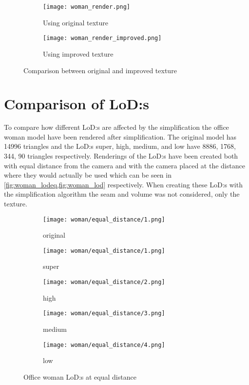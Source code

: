 \begin{figure}[ht]
  \centering
  \begin{subfigure}[b]{.15\textwidth}
    \texttt{[image: woman\_render.png]}
    \caption{Using original texture}
    \label{fig:using_original_texture}
  \end{subfigure}
  \qquad
  \begin{subfigure}[b]{.15\textwidth}
    \texttt{[image: woman\_render\_improved.png]}
    \caption{Using improved texture}
    \label{fig:using_improved_texture}
  \end{subfigure}
  \caption{Comparison between original and improved texture}
  \label{fig:texture_comparison}
\end{figure}

\clearpage

\section{Comparison of LoD:s}

To compare how different LoD:s are affected by the simplification the office woman model have been rendered after simplification. The original model has 14996 triangles and the LoD:s super, high, medium, and low have 8886, 1768, 344, 90 triangles respectively. Renderings of the LoD:s have been created both with equal distance from the camera and with the camera placed at the distance where they would actually be used which can be seen in \cref{fig:woman_lodeq,fig:woman_lod} respectively. When creating these LoD:s with the simplification algorithm the seam and volume was not considered, only the texture.

\begin{figure}[ht]
  \centering
  \begin{subfigure}[b]{.18\textwidth}
    \texttt{[image: woman/equal\_distance/1.png]}
    \caption{original}
    \label{fig:womaneq0}
  \end{subfigure}
  \centering
  \begin{subfigure}[b]{.18\textwidth}
    \texttt{[image: woman/equal\_distance/1.png]}
    \caption{super}
    \label{fig:womaneq1}
  \end{subfigure}
  \begin{subfigure}[b]{.18\textwidth}
    \texttt{[image: woman/equal\_distance/2.png]}
    \caption{high}
    \label{fig:womaneq2}
  \end{subfigure}
  \centering
  \begin{subfigure}[b]{.18\textwidth}
    \texttt{[image: woman/equal\_distance/3.png]}
    \caption{medium}
    \label{fig:womaneq3}
  \end{subfigure}
  \begin{subfigure}[b]{.18\textwidth}
    \texttt{[image: woman/equal\_distance/4.png]}
    \caption{low}
    \label{fig:womaneq4}
  \end{subfigure}
  \caption{Office woman LoD:s at equal distance}
  \label{fig:woman_lodeq}
\end{figure}


